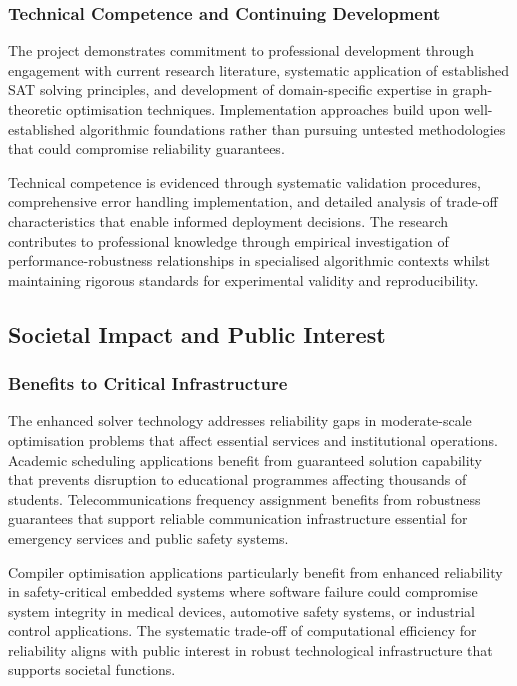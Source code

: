 \subsubsection{Technical Competence and Continuing Development}

The project demonstrates commitment to professional development through engagement with current research literature, systematic application of established SAT solving principles, and development of domain-specific expertise in graph-theoretic optimisation techniques. Implementation approaches build upon well-established algorithmic foundations rather than pursuing untested methodologies that could compromise reliability guarantees.

Technical competence is evidenced through systematic validation procedures, comprehensive error handling implementation, and detailed analysis of trade-off characteristics that enable informed deployment decisions. The research contributes to professional knowledge through empirical investigation of performance-robustness relationships in specialised algorithmic contexts whilst maintaining rigorous standards for experimental validity and reproducibility.

\subsection{Societal Impact and Public Interest}

\subsubsection{Benefits to Critical Infrastructure}

The enhanced solver technology addresses reliability gaps in moderate-scale optimisation problems that affect essential services and institutional operations. Academic scheduling applications benefit from guaranteed solution capability that prevents disruption to educational programmes affecting thousands of students. Telecommunications frequency assignment benefits from robustness guarantees that support reliable communication infrastructure essential for emergency services and public safety systems.

Compiler optimisation applications particularly benefit from enhanced reliability in safety-critical embedded systems where software failure could compromise system integrity in medical devices, automotive safety systems, or industrial control applications. The systematic trade-off of computational efficiency for reliability aligns with public interest in robust technological infrastructure that supports societal functions.


